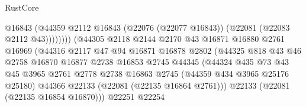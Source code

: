 \begin{lexlean}{RustCore}
\begin{coremodule}
                                              @16843
                                              (@44359
                                                @2112
                                                @16843
                                                (@22076 (@22077 @16843))
                                                (@22081 (@22083 @2112 @43))))))))
                                    (@44305
                                      @2118
                                      @2144
                                      @2170
                                      @43
                                      @16871
                                      @16880
                                      @2761
                                      @16969
                                      (@44316
                                        @2117
                                        @47
                                        @94
                                        @16871
                                        @16878
                                        @2802
                                        (@44325
                                          @818
                                          @43
                                          @46
                                          @2758
                                          @16870
                                          @16877
                                          @2738
                                          @16853
                                          @2745
                                          @44345
                                          (@44324
                                            @435
                                            @73
                                            @43
                                            @45
                                            @3965
                                            @2761
                                            @2778
                                            @2738
                                            @16863
                                            @2745
                                            (@44359 @434 @3965 @25176 @25180)
                                            @44366
                                            @22133
                                            (@22081 (@22135 @16864 @2761)))
                                          @22133
                                          (@22081 (@22135 @16854 @16870)))
                                        @22251
                                        @22254

\end{coremodule}
\end{lexlean}
